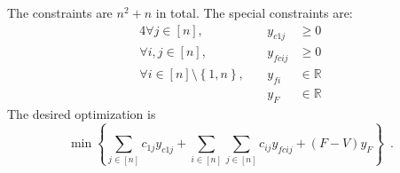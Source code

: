 The constraints are $n^2 + n$ in total. The special constraints are:
\begin{alignat*}{4}
  \forall j \in \left[n\right], && y_{c1j} &\geq 0 \\
  \forall i, j \in \left[n\right], &\:& y_{fcij} &\geq 0 \\
  \forall i \in \left[n\right] \setminus \left\{1, n\right\}, && y_{fi} &\in \mathbb{R} \\
  && y_F &\in \mathbb{R}
\end{alignat*}
The desired optimization is
\begin{equation*}
  \min{\left\{\sum\limits_{j \in \left[n\right]}c_{1j}y_{c1j} + \sum\limits_{i \in \left[n\right]}\sum\limits_{j \in
       \left[n\right]}c_{ij}y_{fcij} + \left(F - V\right)y_F\right\}} \enspace.
\end{equation*}
